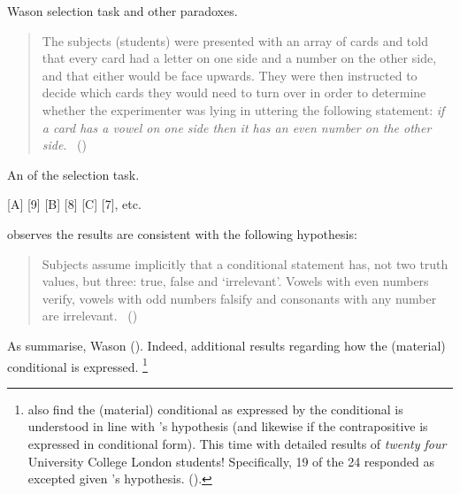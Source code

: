 \begin{note}
  Wason selection task and other paradoxes.

  \begin{quote}
    The subjects (students) were presented with an array of cards and told that every card had a letter on one side and a number on the other side, and that either would be face upwards.
    They were then instructed to decide which cards they would need to turn over in order to determine whether the experimenter was lying in uttering the following statement:
    \emph{if a card has a vowel on one side then it has an even number on the other side}.%
    \mbox{ }\hfill\mbox{(\citeyear[145--146]{Wason:1966aa})}
  \end{quote}

  \begin{center}
    An  of the selection task.

    [A] [9] [B] [8] [C] [7], etc.
  \end{center}

  \citeauthor{Wason:1966aa} observes the results are consistent with the following hypothesis:
  \begin{quote}
    Subjects assume implicitly that a conditional statement has, not two truth values, but three: true, false and `irrelevant'.
    Vowels with even numbers verify, vowels with odd numbers falsify and consonants with any number are irrelevant.%
    \mbox{ }\hfill\mbox{(\citeyear[146]{Wason:1966aa})}
  \end{quote}

  As \citeauthor{Johnson-Laird:1969aa} summarise, Wason  (\citeyear[367]{Johnson-Laird:1969aa}).
  Indeed, \citeauthor{Johnson-Laird:1969aa} additional results regarding how the (material) conditional is expressed.%
  \footnote{
    \citeauthor{Johnson-Laird:1969aa} also find the (material) conditional as expressed by the conditional is understood in line with \citeauthor{Wason:1966aa}'s hypothesis (and likewise if the contrapositive is expressed in conditional form).
    This time with detailed results of \emph{twenty four} University College London students!
    Specifically, 19 of the 24 responded as excepted given \citeauthor{Wason:1966aa}'s hypothesis.
    (\citeyear[369,370]{Johnson-Laird:1969aa}).
  }
\end{note}

